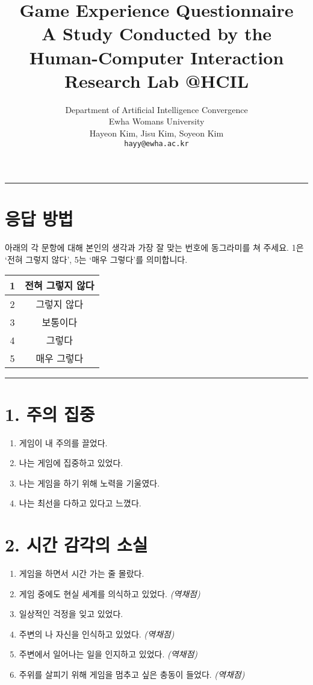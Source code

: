 \documentclass[12pt]{article}
\title{\textbf{Game Experience Questionnaire}\\[0.5em]
\large A Study Conducted by the Human-Computer Interaction Research Lab @HCIL}
\author{Department of Artificial Intelligence Convergence\\
Ewha Womans University\\
Hayeon Kim, Jisu Kim, Soyeon Kim\\
\texttt{hayy@ewha.ac.kr}}
\begin{document}
\maketitle
\hrule
\vspace{0.5cm}

\section*{응답 방법}
아래의 각 문항에 대해 본인의 생각과 가장 잘 맞는 번호에 동그라미를 쳐 주세요.  
1은 ‘전혀 그렇지 않다’, 5는 ‘매우 그렇다’를 의미합니다.

\vspace{0.5cm}

\begin{center}
\begin{tabular}{|c|c|}
\hline
1 & 전혀 그렇지 않다 \\
\hline
2 & 그렇지 않다 \\
\hline
3 & 보통이다 \\
\hline
4 & 그렇다 \\
\hline
5 & 매우 그렇다 \\
\hline
\end{tabular}
\end{center}

\vspace{0.5cm}
\hrule
\vspace{0.5cm}

\section*{1. 주의 집중}

\begin{enumerate}[label=\arabic*.]
  \item 게임이 내 주의를 끌었다.
  \item 나는 게임에 집중하고 있었다.
  \item 나는 게임을 하기 위해 노력을 기울였다.
  \item 나는 최선을 다하고 있다고 느꼈다.
\end{enumerate}

\section*{2. 시간 감각의 소실}

\begin{enumerate}[resume]
  \item 게임을 하면서 시간 가는 줄 몰랐다.
  \item 게임 중에도 현실 세계를 의식하고 있었다. \textit{(역채점)}
  \item 일상적인 걱정을 잊고 있었다.
  \item 주변의 나 자신을 인식하고 있었다. \textit{(역채점)}
  \item 주변에서 일어나는 일을 인지하고 있었다. \textit{(역채점)}
  \item 주위를 살피기 위해 게임을 멈추고 싶은 충동이 들었다. \textit{(역채점)}
\end{enumerate}
\end{document}
